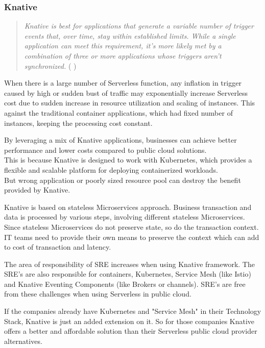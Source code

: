 \documentclass{article}
\begin{document}
\subsubsection{Knative}
\begin{quote}
    \textit{Knative is best for applications that generate a variable number of trigger events that, over time, stay within established limits. While a single application can meet this requirement, it's more likely met by a combination of three or more applications whose triggers aren't synchronized.}  ( \cite{Nolle_2020} )
\end{quote}
\par
\begin{flushleft}
When there is a large number of Serverless function, any inflation in trigger caused by high or sudden bust of traffic may exponentially increase Serverless cost due to sudden increase in resource utilization and scaling of instances. This against the traditional container applications, which had fixed number of instances, keeping the processing cost constant.
\par
By leveraging a mix of Knative applications, businesses can achieve better performance and lower costs compared to public cloud solutions. \\
This is because Knative is designed to work with Kubernetes, which provides a flexible and scalable platform for deploying containerized workloads.\\

But wrong application or poorly sized resource pool can destroy the benefit provided by Knative.
\par
Knative is based on stateless Microservices approach. Business transaction and data is processed by various steps, involving different stateless Microservices. Since stateless Microservices do not preserve state, so do the transaction context. IT teams need to provide their own means to preserve the context which can add to cost of transaction and latency.
\par
The area of responsibility of \gls{SRE} increases when using Knative framework. The \gls{SRE}'s are also responsible for containers, Kubernetes, Service Mesh (like Istio) and Knative Eventing Components (like  Brokers or channels). \gls{SRE}'s are free from these challenges when using Serverless in public cloud.
\par
If the companies already have Kubernetes and "Service Mesh" in their Technology Stack, Knative is just an added extension on it. So for those companies Knative offers a better and affordable solution than their Serverless public cloud provider alternatives.
\par

\end{flushleft}
\end{document}
